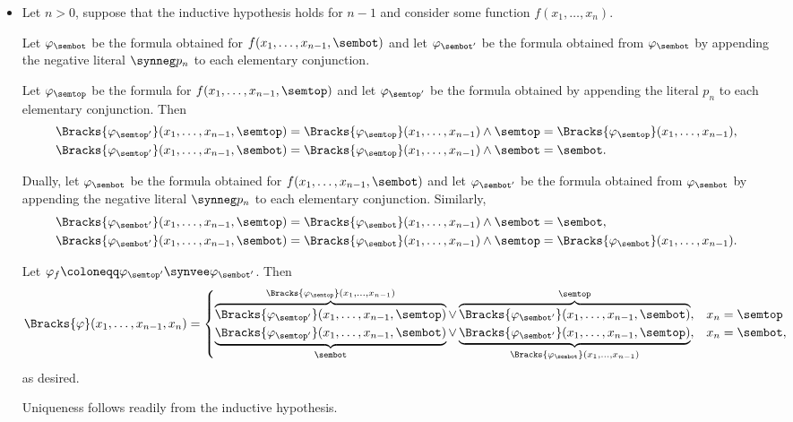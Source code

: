 \begin{defproof}
\begin{itemize}
    Again, uniqueness is obvious.

    \item Let \( n > 0 \), suppose that the inductive hypothesis holds for \( n - 1 \) and consider some function \( f(x_1, \ldots, x_n) \).

    Let \( \varphi_{\sembot} \) be the formula obtained for \( f(x_1, \ldots, x_{n-1}, \sembot) \) and let \( \varphi_{\sembot'} \) be the formula obtained from \( \varphi_{\sembot} \) by appending the negative literal \( \synneg p_n \) to each elementary conjunction.

    Let \( \varphi_{\semtop} \) be the formula for \( f(x_1, \ldots, x_{n-1}, \semtop) \) and let \( \varphi_{\semtop'} \) be the formula obtained by appending the literal \( p_n \) to each elementary conjunction. Then
    \begin{align*}
      \Bracks{\varphi_{\semtop'}}(x_1, \ldots, x_{n-1}, \semtop) &= \Bracks{\varphi_{\semtop}}(x_1, \ldots, x_{n-1}) \wedge \semtop = \Bracks{\varphi_{\semtop}}(x_1, \ldots, x_{n-1}), \\
      \Bracks{\varphi_{\semtop'}}(x_1, \ldots, x_{n-1}, \sembot) &= \Bracks{\varphi_{\semtop}}(x_1, \ldots, x_{n-1}) \wedge \sembot = \sembot.
    \end{align*}

    Dually, let \( \varphi_{\sembot} \) be the formula obtained for \( f(x_1, \ldots, x_{n-1}, \sembot) \) and let \( \varphi_{\sembot'} \) be the formula obtained from \( \varphi_{\sembot} \) by appending the negative literal \( \synneg p_n \) to each elementary conjunction. Similarly,
    \begin{align*}
      \Bracks{\varphi_{\sembot'}}(x_1, \ldots, x_{n-1}, \semtop) &= \Bracks{\varphi_{\sembot}}(x_1, \ldots, x_{n-1}) \wedge \sembot = \sembot, \\
      \Bracks{\varphi_{\sembot'}}(x_1, \ldots, x_{n-1}, \sembot) &= \Bracks{\varphi_{\sembot}}(x_1, \ldots, x_{n-1}) \wedge \semtop = \Bracks{\varphi_{\sembot}}(x_1, \ldots, x_{n-1}).
    \end{align*}

    Let \( \varphi_f \coloneqq \varphi_{\semtop'} \synvee \varphi_{\sembot'} \). Then
    \begin{equation*}
      \Bracks{\varphi}(x_1, \ldots, x_{n-1}, x_n)
      =
      \begin{cases}
        \overbrace{\Bracks{\varphi_{\semtop'}}(x_1, \ldots, x_{n-1}, \semtop)}^{\Bracks{\varphi_{\semtop}}(x_1, \ldots, x_{n-1})} \vee \overbrace{\Bracks{\varphi_{\sembot'}}(x_1, \ldots, x_{n-1}, \sembot)}^{\semtop},   &x_n = \semtop \\
        \underbrace{\Bracks{\varphi_{\semtop'}}(x_1, \ldots, x_{n-1}, \sembot)}_{\sembot} \vee \underbrace{\Bracks{\varphi_{\sembot'}}(x_1, \ldots, x_{n-1}, \semtop)}_{\Bracks{\varphi_{\sembot}}(x_1, \ldots, x_{n-1})}, &x_n = \sembot,
      \end{cases}
    \end{equation*}
    as desired.

    Uniqueness follows readily from the inductive hypothesis.
  \end{itemize}
\end{defproof}


